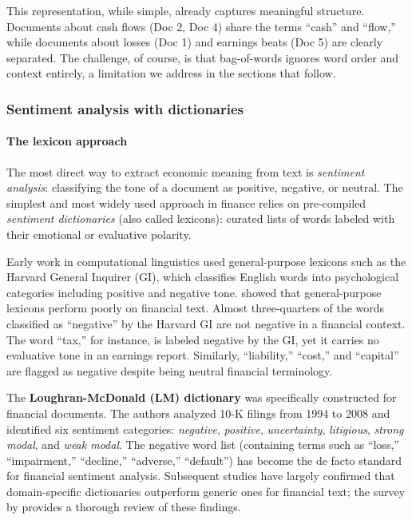 This representation, while simple, already captures meaningful structure. Documents about cash flows (Doc 2, Doc 4) share the terms ``cash'' and ``flow,'' while documents about losses (Doc 1) and earnings beats (Doc 5) are clearly separated. The challenge, of course, is that bag-of-words ignores word order and context entirely, a limitation we address in the sections that follow.

\subsubsection{Sentiment analysis with dictionaries}

\paragraph{The lexicon approach}

The most direct way to extract economic meaning from text is \textit{sentiment analysis}: classifying the tone of a document as positive, negative, or neutral. The simplest and most widely used approach in finance relies on pre-compiled \textit{sentiment dictionaries} (also called lexicons): curated lists of words labeled with their emotional or evaluative polarity.

Early work in computational linguistics used general-purpose lexicons such as the Harvard General Inquirer (GI), which classifies English words into psychological categories including positive and negative tone. \cite{loughran2011liability} showed that general-purpose lexicons perform poorly on financial text. Almost three-quarters of the words classified as ``negative'' by the Harvard GI are not negative in a financial context. The word ``tax,'' for instance, is labeled negative by the GI, yet it carries no evaluative tone in an earnings report. Similarly, ``liability,'' ``cost,'' and ``capital'' are flagged as negative despite being neutral financial terminology.

The \textbf{Loughran-McDonald (LM) dictionary} was specifically constructed for financial documents. The authors analyzed 10-K filings from 1994 to 2008 and identified six sentiment categories: \textit{negative}, \textit{positive}, \textit{uncertainty}, \textit{litigious}, \textit{strong modal}, and \textit{weak modal}. The negative word list (containing terms such as ``loss,'' ``impairment,'' ``decline,'' ``adverse,'' ``default'') has become the de facto standard for financial sentiment analysis. Subsequent studies have largely confirmed that domain-specific dictionaries outperform generic ones for financial text; the survey by \cite{kearney2014textual} provides a thorough review of these findings.

